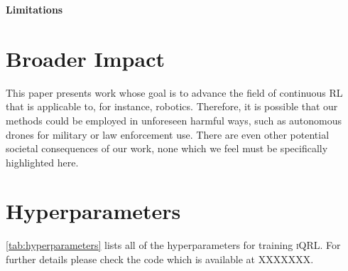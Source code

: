 \documentclass{article}
\theoremstyle{plain}
\theoremstyle{definition}
\theoremstyle{remark}
\newcommand{\our}{\textsc{iQRL}\xspace}
\begin{document}
\textbf{Limitations}

\section*{Broader Impact}
This paper presents work whose goal is to advance the field of continuous RL that is applicable to, for instance, robotics. Therefore, it is possible that our methods could be employed in unforeseen harmful ways, such as autonomous drones for military or law enforcement use. There are even other potential societal consequences of our work, none which we feel must be specifically highlighted here.






\newpage
\appendix
\onecolumn

\section{Hyperparameters}
\cref{tab:hyperparameters} lists all of the hyperparameters for training \our.
For further details please check the code which is available at XXXXXXX.
\end{document}
